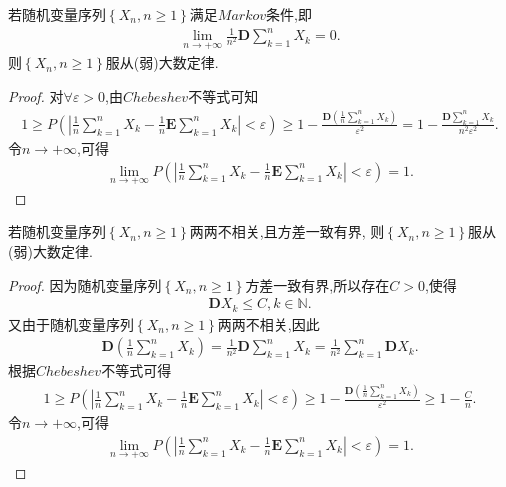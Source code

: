 \documentclass[lang=cn,newtx,10pt,scheme=chinese]{../../Template/elegantbook}
\begin{document}
\begin{theorem}[Markov大数定律]\label{theorem:Markov大数定律}
    若随机变量序列$\left\{ X_n,n\ge 1 \right\}$满足$Markov$条件,即
    \begin{align*}
        \underset{n\rightarrow +\infty}{\lim}\frac{1}{n^2}\boldsymbol{D}\sum_{k=1}^n{X_k}=0.
    \end{align*}
    则$\left\{ X_n,n\ge 1 \right\}$服从(弱)大数定律.
\end{theorem}
\begin{proof}
    对$\forall \varepsilon>0$,由$Chebeshev$不等式可知
    \begin{align*}
        1\geqslant P\left( \left| \frac{1}{n}\sum_{k=1}^n{X_k}-\frac{1}{n}\boldsymbol{E}\sum\limits_{k=1}^n{X_k} \right|<\varepsilon \right) \geqslant 1-\frac{\boldsymbol{D}\left( \frac{1}{n}\sum\limits_{k=1}^n{X_k} \right)}{\varepsilon ^2}=1-\frac{\boldsymbol{D}\sum\limits_{k=1}^n{X_k}}{n^2\varepsilon ^2}.
    \end{align*}
    令$n\to +\infty$,可得
    \begin{align*}
        \underset{n\rightarrow +\infty}{\lim}P\left( \left| \frac{1}{n}\sum_{k=1}^n{X_k}-\frac{1}{n}\boldsymbol{E}\sum_{k=1}^n{X_k} \right|<\varepsilon \right) =1.
    \end{align*}

\end{proof}

\begin{theorem}[Chebeshev大数定律]\label{theorem:Chebeshev大数定律}
    若随机变量序列$\left\{ X_n,n\ge 1 \right\}$两两不相关,且方差一致有界,
    则$\left\{ X_n,n\ge 1 \right\}$服从(弱)大数定律.
\end{theorem}
\begin{proof}
    因为随机变量序列$\left\{ X_n,n\ge 1 \right\}$方差一致有界,所以存在$C>0$,使得
    \begin{align*}
        \boldsymbol{D}X_k\leqslant C,k\in \mathbb{N}.
    \end{align*}
    又由于随机变量序列$\left\{ X_n,n\ge 1 \right\}$两两不相关,因此
    \begin{align*}
        \boldsymbol{D}\left( \frac{1}{n}\sum_{k=1}^n{X_k} \right) =\frac{1}{n^2}\boldsymbol{D}\sum_{k=1}^n{X_k}=\frac{1}{n^2}\sum_{k=1}^n{\boldsymbol{D}X_k}.
    \end{align*}
    根据$Chebeshev$不等式可得
    \begin{align*}
        1\geqslant P\left( \left| \frac{1}{n}\sum_{k=1}^n{X_k}-\frac{1}{n}\boldsymbol{E}\sum_{k=1}^n{X_k} \right|<\varepsilon \right) \geqslant 1-\frac{\boldsymbol{D}\left( \frac{1}{n}\sum\limits_{k=1}^n{X_k} \right)}{\varepsilon ^2}\geqslant 1-\frac{C}{n}.
    \end{align*}
    令$n\to +\infty$,可得
    \begin{align*}
        \underset{n\rightarrow +\infty}{\lim}P\left( \left| \frac{1}{n}\sum_{k=1}^n{X_k}-\frac{1}{n}\boldsymbol{E}\sum_{k=1}^n{X_k} \right|<\varepsilon \right) =1.
    \end{align*}

\end{proof}
\end{document}
